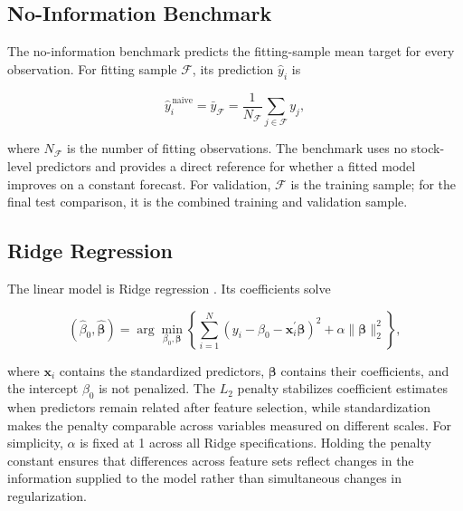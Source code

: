 \subsection{No-Information Benchmark}
\label{sec:no_information_benchmark}

The no-information benchmark predicts the fitting-sample mean target for every observation. For fitting sample \(\mathcal{F}\), its prediction \(\hat{y}_i\) is

\begin{equation}
    \hat{y}^{\,\mathrm{naive}}_i
    =
    \bar{y}_{\mathcal{F}}
    =
    \frac{1}{N_{\mathcal{F}}}
    \sum_{j\in\mathcal{F}} y_j,
    \label{eq:naive_mean}
\end{equation}

\noindent
where \(N_{\mathcal{F}}\) is the number of fitting observations. The benchmark uses no stock-level predictors and provides a direct reference for whether a fitted model improves on a constant forecast. For validation, \(\mathcal{F}\) is the training sample; for the final test comparison, it is the combined training and validation sample.

\subsection{Ridge Regression}
\label{sec:ridge_regression}

The linear model is Ridge regression \parencite{hoerl1970ridge}. Its coefficients solve

\begin{equation}
    \left(\hat{\beta}_0,\hat{\boldsymbol{\beta}}\right)
    =
    \arg\min_{\beta_0,\boldsymbol{\beta}}
    \left\{
    \sum_{i=1}^{N}
    \left(
    y_i-\beta_0-\mathbf{x}_i^{\prime}\boldsymbol{\beta}
    \right)^2
    +
    \alpha\lVert\boldsymbol{\beta}\rVert_2^2
    \right\},
    \label{eq:ridge_objective}
\end{equation}

\noindent
where \(\mathbf{x}_i\) contains the standardized predictors, \(\boldsymbol{\beta}\) contains their coefficients, and the intercept \(\beta_0\) is not penalized. The \(L_2\) penalty stabilizes coefficient estimates when predictors remain related after feature selection, while standardization makes the penalty comparable across variables measured on different scales. For simplicity, \(\alpha\) is fixed at 1 across all Ridge specifications. Holding the penalty constant ensures that differences across feature sets reflect changes in the information supplied to the model rather than simultaneous changes in regularization.

